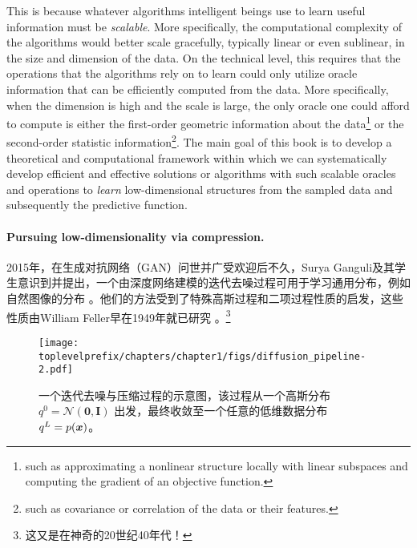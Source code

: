 \documentclass[../../book-main_zh.tex]{subfiles}
\begin{document}
This is because whatever algorithms intelligent beings use to learn useful information must be {\em scalable}. More specifically, the computational complexity of the algorithms would better scale gracefully, typically linear or even sublinear, in the size and dimension of the data. On the technical level, this requires that the operations that the algorithms rely on to learn could only utilize oracle information that can be efficiently computed from the data. More specifically, when the dimension is high and the scale is large, the only oracle one could afford to compute is either the first-order geometric information about the data\footnote{such as approximating a nonlinear structure locally with linear subspaces and computing the gradient of an objective function.} or the second-order statistic information\footnote{such as covariance or correlation of the data or their features.}.
The main goal of this book is to develop a theoretical and computational framework within which we can systematically develop efficient and effective solutions or algorithms with such scalable oracles and operations to {\em learn} low-dimensional structures from the sampled data and subsequently the predictive function.


\paragraph{Pursuing low-dimensionality via compression.}

2015年，在生成对抗网络（GAN）问世并广受欢迎后不久，Surya Ganguli及其学生意识到并提出，一个由深度网络建模的迭代去噪过程可用于学习通用分布，例如自然图像的分布 \cite{Sohl-Dickstein2015}。他们的方法受到了特殊高斯过程和二项过程性质的启发，这些性质由William Feller早在1949年就已研究 \cite{Feller1949OnTT}。\footnote{这又是在神奇的20世纪40年代！} 

\begin{figure}[t]
    \centering
    \texttt{[image: \\toplevelprefix/chapters/chapter1/figs/diffusion\_pipeline-2.pdf]}
    \caption{一个迭代去噪与压缩过程的示意图，该过程从一个高斯分布 $q^0 = \mathcal{N}(\boldsymbol{0}, \boldsymbol{I})$ 出发，最终收敛至一个任意的低维数据分布 $q^L = p(\bm{x})$。}
    \label{fig:diffusion}
\end{figure}
\end{document}
